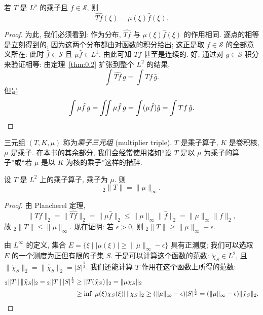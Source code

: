 \begin{proposition}\label{prop:1.4}
若 $T$ 是 $L^p$ 的乘子且 $f\in\mathcal{S}$, 则
\[
\widehat{Tf}(\xi)=\mu(\xi)\hat{f}(\xi).
\]
\end{proposition}

\begin{proof}
为此, 我们必须看到: 作为分布, $\widehat{Tf}$ 与 $\mu(\xi)\hat{f}(\xi)$ 的作用相同. 逐点的相等是立刻得到的, 因为这两个分布都由对函数的积分给出; 这正是取 $f\in\mathcal{S}$ 的全部意义所在: 此时 $\hat{f}\in\mathcal{S}$ 且 $\mu\hat{f}\in L^1$. 由此可知 $Tf$ 甚至是连续的. 好, 通过对 $g\in\mathcal{S}$ 积分来验证相等: 由定理~\ref{thm:0.2} 扩张到整个 $L^2$ 的结果,
\[
\int\widehat{Tf}\,g=\int Tf\,\hat{g}.
\]
但是
\[
\int\mu\hat{f}\,g=\iint\mu\hat{f}\,g=\int(\mu\hat{f})\check{g}=\int Tf\,\hat{g}. \qedhere
\]
\end{proof}

三元组 $(T,K,\mu)$ 称为\emph{乘子三元组} (multiplier triple). $T$ 是乘子算子, $K$ 是卷积核, $\mu$ 是乘子. 在本书的其余部分, 我们会经常使用诸如``设 $T$ 是以 $\mu$ 为乘子的算子''或``若 $\mu$ 是以 $K$ 为核的乘子''这样的措辞.

\begin{proposition}\label{prop:1.5}
设 $T$ 是 $L^2$ 上的乘子算子, 乘子为 $\mu$. 则
\[
{}_2\|T\|=\|\mu\|_{\infty}.
\]
\end{proposition}

\begin{proof}
由 Plancherel 定理,
\[
\|Tf\|_2=\|\widehat{Tf}\|_2=\|\mu\hat{f}\|_2\leq\|\mu\|_{\infty}\|\hat{f}\|_2=\|\mu\|_{\infty}\|f\|_2,
\]
故 ${}_2\|T\|\leq\|\mu\|_{\infty}$. 现在证明: 若 $\epsilon>0$, 则 ${}_2\|T\|\geq\|\mu\|_{\infty}-\epsilon$.

由 $L^\infty$ 的定义, 集合 $E=\{\xi \mid |\mu(\xi)|\geq\|\mu\|_{\infty}-\epsilon\}$ 具有正测度; 我们可以选取 $E$ 的一个测度为正但有限的子集 $S$. 于是可以计算这个函数的范数: $\check{\chi}_S\in L^2$, 且 $\|\check{\chi}_S\|_2=\|\hat{\chi}_S\|_2=|S|^{\frac{1}{2}}$. 我们还能计算 $T$ 作用在这个函数上所得的范数:
\begin{align*}
{}_2\|T\|\,\|\check{\chi}_S\|_2={}_2\|T\|\,|S|^{\frac{1}{2}}&\geq\|T(\check{\chi}_S)\|_2=\|\mu\chi_S\|_2 \\
&\geq\inf|\mu(\xi)\chi_S(\xi)|\,\|\chi_S\|_2
\geq(\|\mu\|_{\infty}-\epsilon)|S|^{\frac{1}{2}}
=(\|\mu\|_{\infty}-\epsilon)\|\check{\chi}_S\|_2. \qedhere
\end{align*}
\end{proof}

